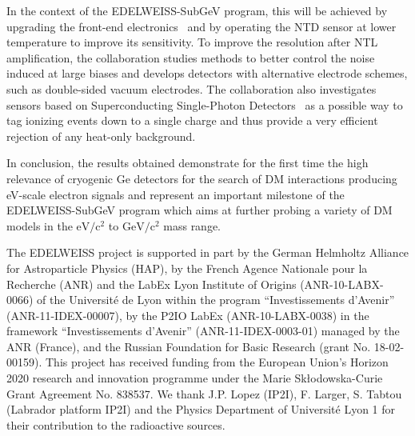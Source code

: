 \documentclass[aps,nofootinbib,floatfix,showpacs,preprintnumbers,twocolumn,superscriptaddress]{revtex4}
\begin{document}
In the context of the EDELWEISS-SubGeV program, this will be achieved by upgrading the front-end electronics~\cite{HEMTS} and by operating the NTD sensor at lower temperature to improve its sensitivity. 
To improve the resolution after NTL amplification, the collaboration studies methods to better control the noise induced at large biases
and develops detectors with alternative electrode schemes, such as double-sided vacuum electrodes. 
The collaboration also investigates sensors based on Superconducting Single-Photon Detectors~\cite{SSPD1,SSPD2} as a possible way to tag ionizing events down to a single charge and thus provide a very efficient rejection of any heat-only background. 


In conclusion, the results obtained demonstrate for the first time the high relevance of cryogenic Ge detectors for the search of DM interactions producing eV-scale electron signals and represent an important milestone of the EDELWEISS-SubGeV program which aims at further probing a variety of DM models in the $\mathrm{eV/c^2}$ to $\mathrm{GeV/c^2}$ mass range.
\begin{acknowledgments}
The EDELWEISS project is supported in part by the German Helmholtz Alliance for Astroparticle Physics (HAP), by the French Agence Nationale pour la Recherche (ANR) and the LabEx Lyon Institute of Origins (ANR-10-LABX-0066) of the Universit\'e de Lyon within the program ``Investissements d'Avenir'' (ANR-11-IDEX-00007), by the P2IO LabEx (ANR-10-LABX-0038) in the framework ``Investissements d'Avenir'' (ANR-11-IDEX-0003-01) managed by the ANR (France), and the Russian Foundation for Basic Research (grant No. 18-02-00159). This project  has  received  funding  from  the  European Union’s Horizon 2020 research and innovation programme under the Marie Skłodowska-Curie Grant Agreement No. 838537.
We thank J.P. Lopez (IP2I), F. Larger, S. Tabtou (Labrador platform IP2I) and the Physics Department of Universit\'{e} Lyon 1 for their contribution to the radioactive sources.
\end{acknowledgments}
\end{document}
